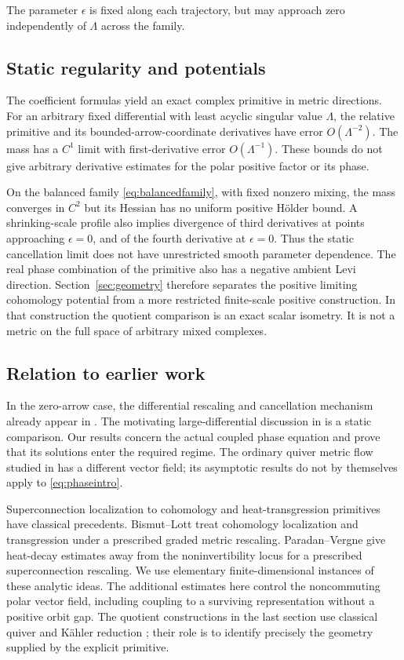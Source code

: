 The parameter $\epsilon$ is fixed along each trajectory, but may
approach zero independently of $\Lambda$ across the family.

\subsection{Static regularity and potentials}
The coefficient formulas yield an exact complex primitive in metric
directions. For an arbitrary fixed differential with least acyclic singular
value $\Lambda$, the relative primitive and its bounded-arrow-coordinate
derivatives have error $O(\Lambda^{-2})$. The mass has a $C^1$ limit with
first-derivative error $O(\Lambda^{-1})$. These bounds do not give arbitrary
derivative estimates for the polar positive factor or its phase.

On the balanced family \eqref{eq:balancedfamily}, with fixed nonzero
mixing, the mass converges in $C^2$ but its Hessian has no uniform
positive H\"older bound. A shrinking-scale profile also implies divergence
of third derivatives at points approaching $\epsilon=0$, and of the
fourth derivative at $\epsilon=0$. Thus the static cancellation limit
does not have unrestricted smooth parameter dependence.
The real phase combination of the primitive also has a negative
ambient Levi direction. Section~\ref{sec:geometry} therefore separates
the positive limiting cohomology potential from a more restricted
finite-scale positive construction. In that construction the quotient
comparison is an exact scalar isometry. It is not a metric on the
full space of arbitrary mixed complexes.

\subsection{Relation to earlier work}
In the zero-arrow case, the differential rescaling and cancellation
mechanism already appear in \cite[Example~4.1]{hkkp26}.
The motivating large-differential discussion in \cite[\S5.4]{hkkp26}
is a static comparison. Our results concern the actual coupled phase
equation and prove that its solutions enter the required regime.
The ordinary quiver metric flow studied in \cite[\S5]{hkkp20}
has a different vector field; its asymptotic results do not by themselves
apply to \eqref{eq:phaseintro}.

Superconnection localization to cohomology and heat-transgression
primitives have classical precedents. Bismut--Lott
\cite[Theorems~2.13 and 2.16]{bl95} treat cohomology localization and
transgression under a prescribed graded metric rescaling.
Paradan--Vergne \cite[\S3.2, Proposition~4 in the preprint]{pv09} give heat-decay
estimates away from the noninvertibility locus for a prescribed
superconnection rescaling. We use elementary finite-dimensional
instances of these analytic ideas. The additional estimates here
control the noncommuting polar vector field, including coupling to
a surviving representation without a positive orbit gap.
The quotient constructions in the last section use classical
quiver and K\"ahler reduction \cite{king94,sj95,sl91}; their role is
to identify precisely the geometry supplied by the explicit primitive.

